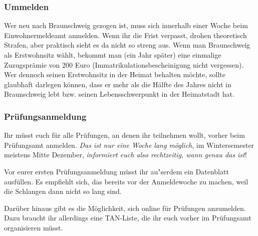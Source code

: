 \begin{multicols}{2}
\subsubsection{Ummelden}
	\label{todoummelden}

	Wer neu nach Braunschweig gezogen ist, muss sich innerhalb einer Woche beim Einwohnermeldeamt anmelden. Wenn ihr die Frist verpasst, drohen theoretisch Strafen, aber praktisch sieht es da nicht so streng aus. Wenn man Braunschweig als Erstwohnsitz wählt, bekommt man (ein Jahr später) eine einmalige Zuzugsprämie von 200 Euro (Immatrikulationsbescheinigung nicht vergessen). Wer dennoch seinen Erstwohnsitz in der Heimat behalten möchte, sollte glaubhaft darlegen können, dass er mehr als die Hälfte des Jahres nicht in Braunschweig lebt bzw. seinen Lebensschwerpunkt in der Heimatstadt hat.

\subsubsection{Prüfungsanmeldung}
	\label{todoanmeldung}

	Ihr müsst euch für alle Prüfungen, an denen ihr teilnehmen wollt, vorher beim Prüfungsamt anmelden. \emph{Das ist nur eine Woche lang möglich}, im Wintersemester meistens Mitte Dezember, \emph{informiert euch also rechtzeitig, wann genau das ist}!

	Vor eurer ersten Prüfungsanmeldung müsst ihr au"serdem ein Datenblatt ausfüllen. Es empfiehlt sich, das bereits vor der Anmeldewoche zu machen, weil die Schlangen dann nicht so lang sind.

	Darüber hinaus gibt es die Möglichkeit, sich online für Prüfungen anzumelden. Dazu braucht ihr allerdings eine TAN-Liste, die ihr euch vorher im Prüfungsamt organisieren müsst.
\end{multicols}